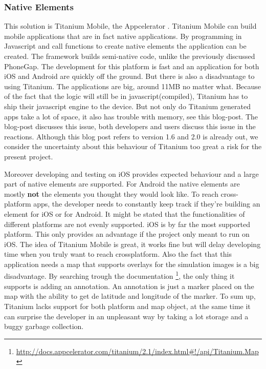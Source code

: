\subsubsection*{Native Elements}
This solution is Titanium Mobile, the Appcelerator \cite{Titanium-Appcelerator}. Titanium Mobile can build mobile applications that are in fact native applications. By programming in Javascript and call functions to create native elements the application can be created. The framework builds semi-native code, unlike the previously discussed PhoneGap. The development for this platform is fast and an application for both iOS and Android are quickly off the ground. But there is also a disadvantage to using Titanium. The applications are big, around 11MB no matter what. Because of the fact that the logic will still be in javascript(compiled), Titanium has to ship their javascript engine to the device. But not only do Titanium generated apps take a lot of space, it also has trouble with memory, see this blog-post\cite{memoryleak}. The blog-post discusses this issue, both developers and users discuss this issue in the reactions. Although this blog post refers to version 1.6 and 2.0 is already out, we consider the uncertainty about this behaviour of Titanium too great a risk for the present project.

Moreover developing and testing on iOS provides expected behaviour and a large part of native elements are supported. For Android the native elements are mostly \textbf{not} the elements you thought they would look like. To reach cross-platform apps, the developer needs to constantly keep track if they're building an element for iOS or for Android. It might be stated that the functionalities of different platforms are not evenly supported. iOS is by far the most supported platform. This only provides an advantage if the project only meant to run on iOS. The idea of Titanium Mobile is great, it works fine but will delay developing time when you truly want to reach crossplatform. Also the fact that this application needs a map that supports overlays for the simulation images is a big disadvantage. By searching trough the documentation \footnote{\url{http://docs.appcelerator.com/titanium/2.1/index.html\#!/api/Titanium.Map}}, the only thing it supports is adding an annotation. An annotation is just a marker placed on the map with the ability to get de latitude and longitude of the marker. To sum up, Titanium lacks support for both platform and map object, at the same time it can surprise the developer in an unpleasant way by taking a lot storage and a buggy garbage collection.

